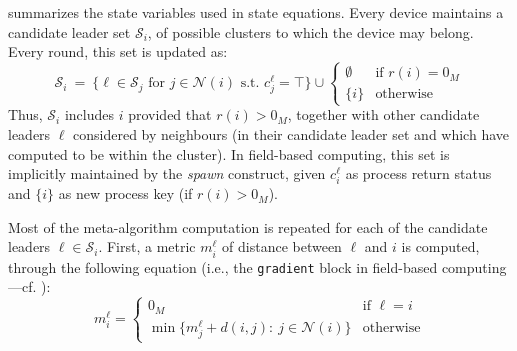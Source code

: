  summarizes the state variables used in state equations.
 Every device maintains a candidate leader set $\mathcal{S}_i$, of possible clusters to which the device may belong. Every round, this set is updated as:
\[
\mathcal{S}_i ~=~ \{ \ell \in \mathcal{S}_j \text{ for } j \in \mathcal{N}(i) \text{ s.t. } c^\ell_j = \top \} \cup \begin{cases}
	\emptyset & \text{if } r(i) = 0_M \\
	\{ i \} & \text{otherwise}
\end{cases}
\]
Thus, $\mathcal{S}_i$ includes $i$ provided that $r(i) > 0_M$, together with other candidate leaders $\ell$ considered by neighbours
 (in their candidate leader set and which have computed to be within the cluster).
 In field-based computing, this set is implicitly maintained by the \emph{spawn} construct,
 given $c^\ell_i$ as process return status and $\{ i \}$ as new process key (if $r(i) > 0_M$).

Most of the meta-algorithm computation is repeated for each of the candidate leaders $\ell \in \mathcal{S}_i$. First, a metric $m^\ell_i$ of distance between $\ell$ and $i$ is computed,
 through the following equation (i.e., the \lstinline|gradient| block in field-based computing---cf. ):
\[
m^\ell_i = \begin{cases}
	0_M & \text{if } \ell = i \\
	\min \{m^\ell_j + d(i,j) : ~ j \in \mathcal{N}(i) \} & \text{otherwise}
\end{cases}
\]

